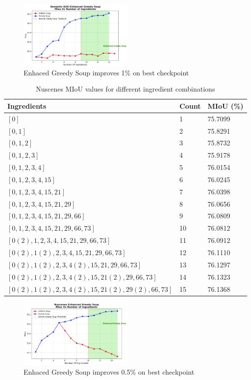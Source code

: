 \documentclass[10pt,twocolumn,letterpaper]{article}
\begin{document}
\begin{figure}[!h]
    \centering
    \includegraphics[width=0.5\textwidth]{photos/semantickitti_soup.png}
    \caption{Enhaced Greedy Soup improves 1\% on best checkpoint }
    \label{fig:photo_example}
\end{figure}
\begin{table}[!h]
\centering
\small
\begin{tabular}{|l|l|l|}
\hline
\textbf{Ingredients} & \textbf{Count} & \textbf{MIoU (\%)} \\
\hline
$[0]$ & 1 & 75.7099\\
$[0,1]$ & 2 & 75.8291\\
$[0,1,2]$ & 3 & 75.8732 \\
$[0,1,2,3]$ & 4 & 75.9178 \\
$[0,1,2,3,4]$ & 5 & 76.0154 \\
$[0,1,2,3,4,15]$ & 6 & 76.0245 \\
$[0,1,2,3,4,15,21]$ & 7 & 76.0398 \\
$[0,1,2,3,4,15,21,29]$ & 8 & 76.0656 \\
$[0,1,2,3,4,15,21,29,66]$ & 9 & 76.0809 \\
$[0,1,2,3,4,15,21,29,66,73]$ & 10 & 76.0812 \\
$[0(2),1,2,3,4,15,21,29,66,73]$ & 11 & 76.0912 \\
$[0(2),1(2),2,3,4,15,21,29,66,73]$ & 12 & 76.1110 \\
$[0(2),1(2),2,3,4(2),15,21,29,66,73]$ & 13 & 76.1297 \\
$[0(2),1(2),2,3,4(2),15,21(2),29,66,73]$ & 14 & 76.1323 \\
$[0(2),1(2),2,3,4(2),15,21(2),29(2),66,73]$ & 15 & 76.1368 \\
\hline
\end{tabular}
\caption{Nuscenes MIoU values for different ingredient combinations}
\end{table}


\begin{figure}[!h]
    \centering
    \includegraphics[width=0.5\textwidth]{photos/nuscenes_soup.png}
    \caption{Enhaced Greedy Soup improves 0.5\% on best checkpoint }
    \label{fig:photo_example}
\end{figure}
\end{document}

